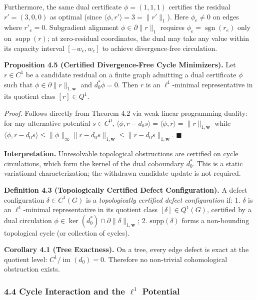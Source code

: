 \documentclass[
]{article}
\begin{document}
Furthermore, the same dual certificate \(\phi = (1, 1, 1)\) certifies the residual \(r' = (3, 0, 0)\) as optimal (since \(\langle \phi, r' \rangle = 3 = \|r'\|_1\)). Here \(\phi_e \ne 0\) on edges where \(r'_e = 0\). Subgradient alignment \(\phi \in \partial \|r\|_1\) requires \(\phi_e = \operatorname{sgn}(r_e)\) only on \(\operatorname{supp}(r)\); at zero-residual coordinates, the dual may take any value within its capacity interval \([-w_e, w_e]\) to achieve divergence-free circulation.

\textbf{Proposition 4.5 (Certified Divergence-Free Cycle Minimizers).}
Let \(r \in C^1\) be a candidate residual on a finite graph admitting a dual certificate \(\phi\) such that \(\phi \in \partial \|r\|_{1,\mathbf{w}}\) and \(d_0^* \phi = 0\). Then \(r\) is an \(\ell^1\)-minimal representative in its quotient class \([r] \in Q^1\).

\emph{Proof.} Follows directly from Theorem 4.2 via weak linear programming duality: for any alternative potential \(s \in C^0\), \(\langle \phi, r - d_0 s \rangle = \langle \phi, r \rangle = \|r\|_{1,\mathbf{w}}\) while \(\langle \phi, r - d_0 s \rangle \le \|\phi\|_\infty \|r - d_0 s\|_{1,\mathbf{w}} \le \|r - d_0 s\|_{1,\mathbf{w}}\). \(\blacksquare\)

\textbf{Interpretation.} Unresolvable topological obstructions are certified on cycle circulations, which form the kernel of the dual coboundary \(d_0^*\). This is a static variational characterization; the withdrawn candidate update is not required.

\textbf{Definition 4.3 (Topologically Certified Defect Configuration).} A defect configuration \(\delta \in C^1(G)\) is a \emph{topologically certified defect configuration} if:
1. \(\delta\) is an \(\ell^1\)-minimal representative in its quotient class \([\delta] \in Q^1(G)\), certified by a dual circulation \(\phi \in \ker(d_0^*) \cap \partial \|\delta\|_{1,\mathbf{w}}\);
2. \(\mathrm{supp}(\delta)\) forms a non-bounding topological cycle (or collection of cycles).

\textbf{Corollary 4.1 (Tree Exactness).} On a tree, every edge defect is exact at the quotient level:
\(C^1/\operatorname{im}(d_0)=0\). Therefore no non-trivial cohomological obstruction exists.

\subsubsection{\texorpdfstring{4.4 Cycle Interaction and the \(\ell^1\) Potential}{4.4 Cycle Interaction and the \textbackslash ell\^{}1 Potential}}\label{cycle-interaction-and-the-ell1-potential}
\end{document}
